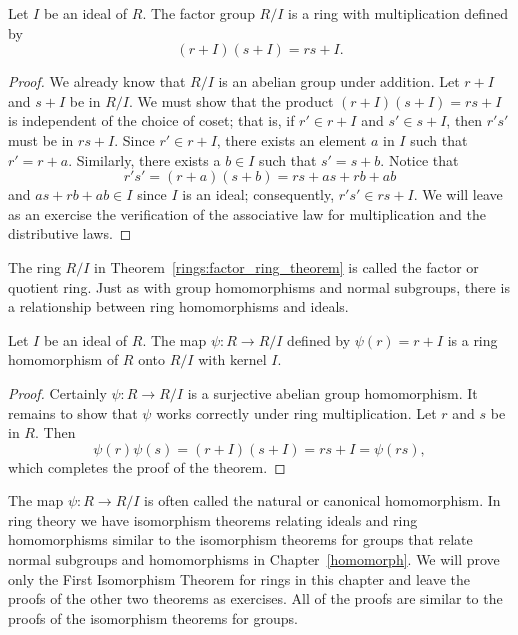  
 
\begin{theorem}\label{rings:factor_ring_theorem}
Let $I$ be an ideal of $R$. The factor group $R/I$ is a ring with
multiplication defined by
\[
(r + I)(s + I) = rs + I.
\]
\end{theorem}
 
 
\begin{proof}
We already know that $R/I$ is an abelian group under addition. Let
$r+I$ and $s +I$ be in $R/I$. We must show that the product $(r + I)(s
+ I) = rs + I$ is independent of the choice of coset; that is, if $r' \in
r+I$ and $s' \in s+I$, then $r's'$ must be in $rs+I$. Since $r' \in
r+I$, there exists an element $a$  in $I$ such that $r' = r + a$.
Similarly, there exists a $b \in I$ such that $s' = s + b$. Notice
that 
\[
r' s' = (r+a)(s+b) = rs + as + rb + ab
\]
and $as + rb + ab \in I$ since $I$ is an ideal; consequently, $r' s'
\in rs + I$. We will leave as an exercise the verification of the 
associative law for multiplication and the distributive laws.
\end{proof}
 
 
\medskip
 
 
The ring $R/I$ in Theorem~\ref{rings:factor_ring_theorem} is called the {\bfi
factor\/} or {\bfi quotient
ring}. Just as with group homomorphisms and
normal subgroups, there is a relationship between ring homomorphisms
and ideals.  
 
 
\begin{theorem}
Let $I$ be an ideal of $R$. The map $\psi : R \rightarrow R/I$ defined
by $\psi( r ) = r + I$ is a ring homomorphism of $R$ onto $R/I$ with
kernel $I$.
\end{theorem}
 
 
\begin{proof}
Certainly $\psi : R \rightarrow R/I$ is a surjective abelian group
homomorphism. It remains to show that $\psi$ works correctly under
ring multiplication.  Let $r$ and $s$ be in $R$. Then
\[
\psi(r) \psi(s) = (r + I)(s+I) = rs + I = \psi(rs),
\]
which completes the proof of the theorem.
\end{proof}
 
 
\medskip
 
 
The map $\psi : R \rightarrow R/I$ is often called the {\bfi
natural\/} or {\bfi canonical
homomorphism}. In ring theory we have
isomorphism  theorems relating ideals and ring homomorphisms similar
to the isomorphism theorems for groups that relate normal subgroups
and homomorphisms in Chapter~\ref{homomorph}. We will prove only the First
Isomorphism Theorem for rings in this chapter and  leave the proofs of
the other two theorems as exercises. All of the proofs are similar to
the proofs of the isomorphism theorems for groups. 
 
